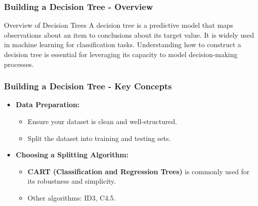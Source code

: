 \documentclass[aspectratio=169]{beamer}
\begin{document}
\begin{frame}
    \frametitle{Building a Decision Tree - Overview}
    \begin{block}{Overview of Decision Trees}
        A decision tree is a predictive model that maps observations about an item to conclusions about its target value. 
        It is widely used in machine learning for classification tasks. Understanding how to construct a decision tree is essential for leveraging its capacity to model decision-making processes.
    \end{block}
\end{frame}

\begin{frame}
    \frametitle{Building a Decision Tree - Key Concepts}
    \begin{itemize}
        \item \textbf{Data Preparation:}
        \begin{itemize}
            \item Ensure your dataset is clean and well-structured.
            \item Split the dataset into training and testing sets.
        \end{itemize}
        
        \item \textbf{Choosing a Splitting Algorithm:}
        \begin{itemize}
            \item \textbf{CART (Classification and Regression Trees)} is commonly used for its robustness and simplicity.
            \item Other algorithms: ID3, C4.5.
        \end{itemize}
    \end{itemize}
\end{frame}
\end{document}
